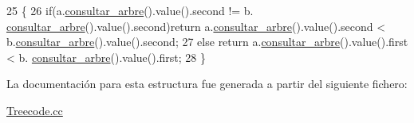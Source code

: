 \begin{DoxyCode}
25                                                                 \{
26         \textcolor{keywordflow}{if}(a.\hyperlink{class_treecode_a781e52014473e0a905763a6a537cc2aa}{consultar\_arbre}().value().second != b.
      \hyperlink{class_treecode_a781e52014473e0a905763a6a537cc2aa}{consultar\_arbre}().value().second)\textcolor{keywordflow}{return} a.\hyperlink{class_treecode_a781e52014473e0a905763a6a537cc2aa}{consultar\_arbre}().value().second < 
      b.\hyperlink{class_treecode_a781e52014473e0a905763a6a537cc2aa}{consultar\_arbre}().value().second;
27         \textcolor{keywordflow}{else} \textcolor{keywordflow}{return} a.\hyperlink{class_treecode_a781e52014473e0a905763a6a537cc2aa}{consultar\_arbre}().value().first < b.
      \hyperlink{class_treecode_a781e52014473e0a905763a6a537cc2aa}{consultar\_arbre}().value().first;
28     \}
\end{DoxyCode}


La documentación para esta estructura fue generada a partir del siguiente fichero\+:\begin{DoxyCompactItemize}
\item 
\hyperlink{_treecode_8cc}{Treecode.\+cc}\end{DoxyCompactItemize}
